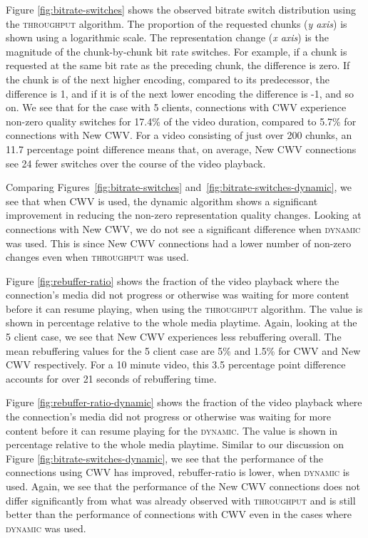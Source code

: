 \documentclass[10pt,sigconf]{acmart}
\begin{document}
Figure \ref{fig:bitrate-switches} shows the observed bitrate switch distribution using the  \textsc{throughput} algorithm. The proportion of the requested chunks (\emph{y axis}) is shown using a logarithmic scale. The representation change (\emph{x axis}) is the magnitude of the chunk-by-chunk bit rate switches. For example, if a chunk is requested at the same bit rate as the preceding chunk, the difference is zero. If the chunk is of the next higher encoding, compared to its predecessor, the difference is 1, and if it is of the next lower encoding the difference is -1, and so on. We see that for the case with 5 clients, connections with CWV experience non-zero quality switches for 17.4\% of the video duration, compared to 5.7\% for connections with New CWV. For a video consisting of just over 200 chunks, an 11.7 percentage point difference means that, on average, New CWV connections see 24 fewer switches over the course of the video playback.


Comparing Figures~\ref{fig:bitrate-switches} and~\ref{fig:bitrate-switches-dynamic}, we see that when CWV is used, the dynamic algorithm shows a significant improvement in reducing the non-zero representation quality changes. Looking at connections with New CWV, we do not see a significant difference when \textsc{dynamic} was used. This is since New CWV connections had a lower number of non-zero changes even when \textsc{throughput} was used.


Figure \ref{fig:rebuffer-ratio} shows the fraction of the video playback where the connection's media did not progress or otherwise was waiting for more content before it can resume playing, when using the \textsc{throughput} algorithm. The value is shown in percentage relative to the whole media playtime. Again, looking at the 5 client case, we see that New CWV experiences less rebuffering overall. The mean rebuffering values for the 5 client case are 5\% and 1.5\% for CWV and New CWV respectively. For a 10 minute video, this 3.5 percentage point difference accounts for over 21 seconds of rebuffering time.

Figure \ref{fig:rebuffer-ratio-dynamic} shows the fraction of the video playback where the connection's media did not progress or otherwise was waiting for more content before it can resume playing for the \textsc{dynamic}. The value is shown in percentage relative to the whole media playtime. Similar to our discussion on Figure \ref{fig:bitrate-switches-dynamic}, we see that the performance of the connections using CWV has improved, rebuffer-ratio is lower, when \textsc{dynamic} is used. Again, we see that the performance of the New CWV connections does not differ significantly from what was already observed with \textsc{throughput} and is still better than the performance of connections with CWV even in the cases where \textsc{dynamic} was used.
\end{document}
